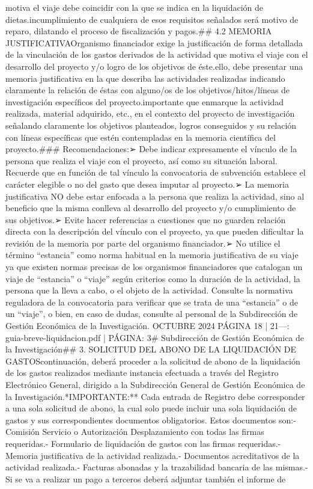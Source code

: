 \documentclass{article}
\begin{document}
\begin{itemize}
{{motiva el viaje debe coincidir con la que se indica en la liquidación de dietas.\n\nEl incumplimiento de cualquiera de esos requisitos señalados será motivo de reparo, dilatando el proceso de fiscalización y pagos.\n\n## 4.2 MEMORIA JUSTIFICATIVA\n\nEl Organismo financiador exige la justificación de forma detallada de la vinculación de los gastos derivados de la actividad que motiva el viaje con el desarrollo del proyecto y/o logro de los objetivos de éste.\n\nPor ello, debe presentar una memoria justificativa en la que describa las actividades realizadas indicando claramente la relación de éstas con alguno/os de los objetivos/hitos/líneas de investigación específicos del proyecto.\n\nEs importante que enmarque la actividad realizada, material adquirido, etc., en el contexto del proyecto de investigación señalando claramente los objetivos planteados, logros conseguidos y su relación con líneas específicas que estén contempladas en la memoria científica del proyecto.\n\n### Recomendaciones:\n\n➢ Debe indicar expresamente el vínculo de la persona que realiza el viaje con el proyecto, así como su situación laboral. Recuerde que en función de tal vínculo la convocatoria de subvención establece el carácter elegible o no del gasto que desea imputar al proyecto.\n\n➢ La memoria justificativa NO debe estar enfocada a la persona que realiza la actividad, sino al beneficio que la misma conlleva al desarrollo del proyecto y/o cumplimiento de sus objetivos.\n\n➢ Evite hacer referencias a cuestiones que no guarden relación directa con la descripción del vínculo con el proyecto, ya que pueden dificultar la revisión de la memoria por parte del organismo financiador.\n\n➢ No utilice el término “estancia” como norma habitual en la memoria justificativa de su viaje ya que existen normas precisas de los organismos financiadores que catalogan un viaje de “estancia” o “viaje” según criterios como la duración de la actividad, la persona que la lleva a cabo, o el objeto de la actividad. Consulte la normativa reguladora de la convocatoria para verificar que se trata de una “estancia” o de un “viaje”, o bien, en caso de dudas, consulte al personal de la Subdirección de Gestión Económica de la Investigación.\n{} OCTUBRE 2024 PÁGINA 18 | 21\n\n---\n\nFUENTE: guia-breve-liquidacion.pdf | PÁGINA: 3\n# Subdirección de Gestión Económica de la Investigación\n\n## 3. SOLICITUD DEL ABONO DE LA LIQUIDACIÓN DE GASTOS\n\nA continuación, deberá proceder a la solicitud de abono de la liquidación de los gastos realizados mediante instancia efectuada a través del Registro Electrónico General, dirigido a la Subdirección General de Gestión Económica de la Investigación.\n\n**IMPORTANTE:** Cada entrada de Registro debe corresponder a una sola solicitud de abono, la cual solo puede incluir una sola liquidación de gastos y sus correspondientes documentos obligatorios. Estos documentos son:\n\n- Comisión Servicio o Autorización Desplazamiento con todas las firmas requeridas.\n- Formulario de liquidación de gastos con las firmas requeridas.\n- Memoria justificativa de la actividad realizada.\n- Documentos acreditativos de la actividad realizada.\n- Facturas abonadas y la trazabilidad bancaria de las mismas.\n- Si se va a realizar un pago a terceros deberá adjuntar también el informe de }}
\end{itemize}
\end{document}
